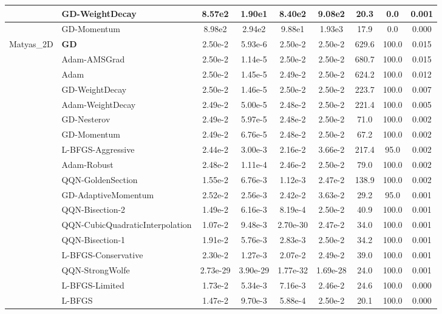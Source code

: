 \documentclass[10pt]{article}
\begin{document}
\begin{longtable}{|l|l|c|c|c|c|c|c|c|}
\hline
 & GD-WeightDecay & 8.57e2 & 1.90e1 & 8.40e2 & 9.08e2 & 20.3 & 0.0 & 0.001 \\
\hline
 & GD-Momentum & 8.98e2 & 2.94e2 & 9.88e1 & 1.93e3 & 17.9 & 0.0 & 0.000 \\
Matyas\_2D & \textbf{GD} & 2.50e-2 & 5.93e-6 & 2.50e-2 & 2.50e-2 & 629.6 & 100.0 & 0.015 \\
\hline
 & Adam-AMSGrad & 2.50e-2 & 1.14e-5 & 2.50e-2 & 2.50e-2 & 680.7 & 100.0 & 0.015 \\
\hline
 & Adam & 2.50e-2 & 1.45e-5 & 2.49e-2 & 2.50e-2 & 624.2 & 100.0 & 0.012 \\
\hline
 & GD-WeightDecay & 2.50e-2 & 1.46e-5 & 2.50e-2 & 2.50e-2 & 223.7 & 100.0 & 0.007 \\
\hline
 & Adam-WeightDecay & 2.49e-2 & 5.00e-5 & 2.48e-2 & 2.50e-2 & 221.4 & 100.0 & 0.005 \\
\hline
 & GD-Nesterov & 2.49e-2 & 5.97e-5 & 2.48e-2 & 2.50e-2 & 71.0 & 100.0 & 0.002 \\
\hline
 & GD-Momentum & 2.49e-2 & 6.76e-5 & 2.48e-2 & 2.50e-2 & 67.2 & 100.0 & 0.002 \\
\hline
 & L-BFGS-Aggressive & 2.44e-2 & 3.00e-3 & 2.16e-2 & 3.66e-2 & 217.4 & 95.0 & 0.002 \\
\hline
 & Adam-Robust & 2.48e-2 & 1.11e-4 & 2.46e-2 & 2.50e-2 & 79.0 & 100.0 & 0.002 \\
\hline
 & QQN-GoldenSection & 1.55e-2 & 6.76e-3 & 1.12e-3 & 2.47e-2 & 138.9 & 100.0 & 0.002 \\
\hline
 & GD-AdaptiveMomentum & 2.52e-2 & 2.56e-3 & 2.42e-2 & 3.63e-2 & 29.2 & 95.0 & 0.001 \\
\hline
 & QQN-Bisection-2 & 1.49e-2 & 6.16e-3 & 8.19e-4 & 2.50e-2 & 40.9 & 100.0 & 0.001 \\
\hline
 & QQN-CubicQuadraticInterpolation & 1.07e-2 & 9.48e-3 & 2.70e-30 & 2.47e-2 & 34.0 & 100.0 & 0.001 \\
\hline
 & QQN-Bisection-1 & 1.91e-2 & 5.76e-3 & 2.83e-3 & 2.50e-2 & 34.2 & 100.0 & 0.001 \\
\hline
 & L-BFGS-Conservative & 2.30e-2 & 1.27e-3 & 2.07e-2 & 2.49e-2 & 39.0 & 100.0 & 0.001 \\
\hline
 & QQN-StrongWolfe & 2.73e-29 & 3.90e-29 & 1.77e-32 & 1.69e-28 & 24.0 & 100.0 & 0.001 \\
\hline
 & L-BFGS-Limited & 1.73e-2 & 5.34e-3 & 7.16e-3 & 2.46e-2 & 24.6 & 100.0 & 0.000 \\
\hline
 & L-BFGS & 1.47e-2 & 9.70e-3 & 5.88e-4 & 2.50e-2 & 20.1 & 100.0 & 0.000 \\

\end{longtable}
\end{document}
